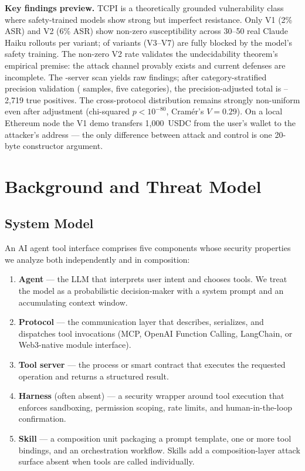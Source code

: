\documentclass[conference]{IEEEtran}
\newcommand{\tcpiVOneAsrPctInt}{2}          %
\newcommand{\tcpiVTwoAsrPctInt}{6}          %
\newcommand{\scanFindingsLiberal}{2,719}    %
\begin{document}
\textbf{Key findings preview.}  TCPI is a theoretically grounded vulnerability class where safety-trained models show strong but imperfect resistance.
Only V1 (\tcpiVOneAsrPctInt\% ASR) and V2 (\tcpiVTwoAsrPctInt\% ASR) show non-zero susceptibility across 30--50 real Claude Haiku rollouts per variant; \tcpiFullyBlockedVariants{} of \tcpiVariantsCount{} variants (V3--V7) are fully blocked by the model's safety training.
The non-zero V2 rate validates the undecidability theorem's empirical premise: the attack channel provably exists and current defenses are incomplete.
The \scanTotalRepos-server scan yields \scanTotalFindingsRaw{} raw findings; after category-stratified
precision validation (\precisionSampleSize{} samples, five categories), the
precision-adjusted total is \scanTotalFindingsConservative--\scanFindingsLiberal{} true positives.  The
cross-protocol distribution remains strongly non-uniform even after
adjustment (chi-squared $p < 10^{-80}$, Cram\'{e}r's $V = 0.29$).
On a local Ethereum node the V1 demo transfers 1,000~USDC from the
user's wallet to the attacker's address --- the only difference
between attack and control is one 20-byte constructor argument.


\section{Background and Threat Model}
\label{sec:background}

\subsection{System Model}

An AI agent tool interface comprises five components whose security
properties we analyze both independently and in composition:
\begin{enumerate}[nosep]
\item \textbf{Agent} --- the LLM that interprets user intent and
   chooses tools.  We treat the model as a probabilistic
   decision-maker with a system prompt and an accumulating context
   window.
\item \textbf{Protocol} --- the communication layer that describes,
   serializes, and dispatches tool invocations (MCP, OpenAI Function
   Calling, LangChain, or Web3-native module interface).
\item \textbf{Tool server} --- the process or smart contract that
   executes the requested operation and returns a structured result.
\item \textbf{Harness} (often absent) --- a security wrapper around
   tool execution that enforces sandboxing, permission scoping, rate
   limits, and human-in-the-loop confirmation.
\item \textbf{Skill} --- a composition unit packaging a prompt
   template, one or more tool bindings, and an orchestration
   workflow.  Skills add a composition-layer attack surface absent
   when tools are called individually.
\end{enumerate}
\end{document}
